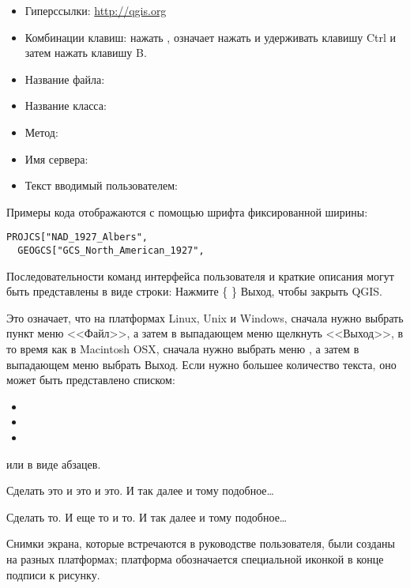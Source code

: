 \begin{itemize}[label=--]
\item Гиперссылки: \url{http://qgis.org}
\item Комбинации клавиш: нажать , означает
нажать и удерживать клавишу Ctrl и затем нажать клавишу B.
\item Название файла: 
\item Название класса: 
\item Метод: 
\item Имя сервера: 
\item Текст вводимый пользователем: 
\end{itemize}

Примеры кода отображаются с помощью шрифта фиксированной ширины:
\begin{verbatim}
PROJCS["NAD_1927_Albers",
  GEOGCS["GCS_North_American_1927",
\end{verbatim}


Последовательности команд интерфейса пользователя и краткие описания
 могут быть представлены в виде строки: Нажмите \{\nix{}
\} \arrow Выход, чтобы закрыть QGIS.

Это означает, что на платформах Linux, Unix и Windows, сначала нужно
выбрать пункт меню <<Файл>>, а затем в выпадающем меню щелкнуть <<Выход>>,
в то время как в Macintosh OSX, сначала нужно выбрать меню \qg,
а затем в выпадающем меню выбрать Выход. Если нужно большее количество
текста, оно может быть представлено списком:

\begin{itemize}
\item {}
\item {}
\item {}
\end{itemize}

или в виде абзацев.

\nix{} \osx{} Сделать это и это и это. И так далее и тому подобное\dots

\win{}Сделать то. И еще то и то. И так далее и тому подобное\dots

Снимки экрана, которые встречаются в руководстве пользователя, были
созданы на разных платформах; платформа обозначается специальной иконкой
в конце подписи к рисунку.

